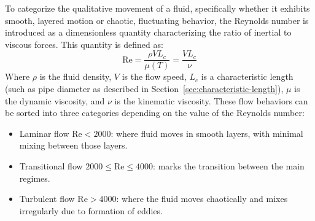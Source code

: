 
To categorize the qualitative movement of a fluid, specifically whether it exhibits smooth, layered motion or chaotic, fluctuating behavior, the Reynolds number is introduced as a dimensionless quantity characterizing the ratio of inertial to viscous forces.
This quantity is defined as:
\begin{equation}
	\mathrm{Re} = \frac{\rho V L_c}{\mu(T)} = \frac{V L_c}{\nu}
	\label{eq:reynolds-number}
\end{equation}
Where $\rho$ is the fluid density, $V$ is the flow speed, $L_c$ is a characteristic length (such as pipe diameter as described in Section~\ref{sec:characteristic-length}), $\mu$ is the dynamic viscosity, and $\nu$ is the kinematic viscosity.
These flow behaviors can be sorted into three categories depending on the value of the Reynolds number:
\cite{Cengel2017, anderson2021modern}
\begin{itemize}
	\item Laminar flow $\mathrm{Re} < 2000$: where fluid moves in smooth layers, with minimal mixing between those layers.
	\item Transitional flow $2000 \le \mathrm{Re} \le 4000$: marks the transition between the main regimes.
	\item Turbulent flow $\mathrm{Re} > 4000$: where the fluid moves chaotically and mixes irregularly due to formation of eddies.
\end{itemize}
